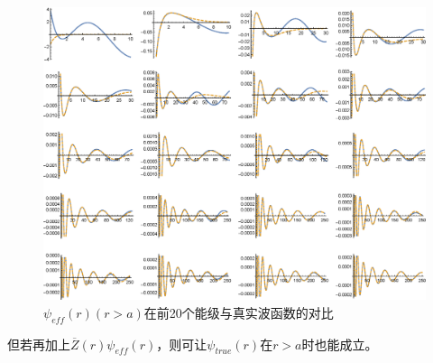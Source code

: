 \documentclass[hyperref,cs4size,titlepage]{ctexart}
\begin{document}
\clearpage
\begin{figure}[!htbp]
  \centering
  \includegraphics[width=6in]{psir_2.eps}
  \caption{$\psi_{eff}(r)(r>a)$在前20个能级与真实波函数的对比}
\end{figure}
但若再加上$\overline{Z}(r)\psi_{eff}(r)$，则可让$\psi_{true}(r)$在$r>a$时也能成立。
\end{document}
